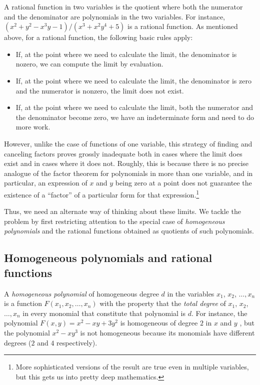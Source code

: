 \documentclass[10pt]{amsart}
\begin{document}
A rational function in two variables is the quotient where both the
numerator and the denominator are polynomials in the two
variables. For instance, $(x^2 + y^2 - x^3y - 1)/(x^3 + x^2y^4 + 5)$
is a rational function. As mentioned above, for a rational function,
the following basic rules apply:

\begin{itemize}
\item If, at the point where we need to calculate the limit, the
  denominator is nozero, we can compute the limit by evaluation.
\item If, at the point where we need to calculate the limit, the
  denominator is zero and the numerator is nonzero, the limit does not exist.
\item If, at the point where we need to calculate the limit, both the
  numerator and the denominator become zero, we have an indeterminate
  form and need to do more work.
\end{itemize}

However, unlike the case of functions of one variable, this strategy
of finding and canceling factors proves grossly inadequate both in
cases where the limit does exist and in cases where it does
not. Roughly, this is because there is no precise analogue of the
factor theorem for polynomials in more than one variable, and in
particular, an expression of $x$ and $y$ being zero at a point does
not guarantee the existence of a ``factor'' of a particular form for
that expression.\footnote{More sophisticated versions of the result
are true even in multiple variables, but this gets us into pretty deep
mathematics.}

Thus, we need an alternate way of thinking about these limits. We
tackle the problem by first restricting attention to the special case
of {\em homogeneous polynomials} and the rational functions obtained
as quotients of such polynomials.

\subsection{Homogeneous polynomials and rational functions}

A {\em homogeneous polynomial} of homogeneous degree $d$ in the
variables $x_1$, $x_2$, $\dots, x_n$ is a function
$F(x_1,x_2,\dots,x_n)$ with the property that the {\em total degree}
of $x_1$, $x_2$, $\dots, x_n$ in every monomial that constitute that
polynomial is $d$. For instance, the polynomial $F(x,y) = x^2 - xy +
3y^2$ is homogeneous of degree $2$ in $x$ and $y$ , but the polynomial
$x^2 - xy^3$ is not homogeneous because its monomials have different
degrees ($2$ and $4$ respectively).
\end{document}
